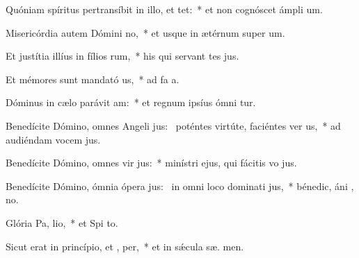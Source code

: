 \item Quóniam spíritus pertransíbit in illo, et  tet:~* et non cognóscet ámpli  um.
\item Misericórdia autem Dómini  no,~* et usque in ætérnum super  um.
\item Et justítia illíus in fílios rum,~* his qui servant tes jus.
\item Et mémores sunt mandató us,~* ad fa a.
\item Dóminus in cælo parávit  am:~* et regnum ipsíus ómni tur.
\item Benedícite Dómino, omnes Angeli jus:~\pscross{} poténtes virtúte, faciéntes ver us,~* ad audiéndam vocem  jus.
\item Benedícite Dómino, omnes vir jus:~* minístri ejus, qui fácitis vo jus.
\item Benedícite Dómino, ómnia ópera jus:~\pscross{} in omni loco dominati jus,~* bénedic, áni , no.
\item Glória Pa,  lio,~* et Spi to.
\item Sicut erat in princípio, et ,  per,~* et in sǽcula sæ. men.
